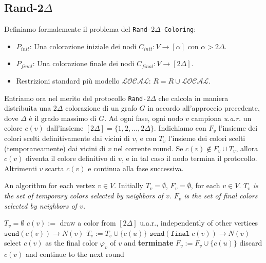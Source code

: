 \subsection{Rand-2$\Delta$}

Definiamo formalemente il problema del \texttt{Rand-$2\Delta$-Coloring}:
\begin{itemize}
    \item $P_{init}$: Una colorazione iniziale dei nodi $C_{init}: V \to [\alpha]$ con $\alpha > 2\Delta$.
    \item $P_{final}$: Una colorazione finale dei nodi $C_{final}: V \to [2\Delta]$.
    \item Restrizioni standard più modello $\mathcal{LOCAL}$: $R = R \cup \mathcal{LOCAL}$.
\end{itemize}

Entriamo ora nel merito del protocollo \texttt{Rand-$2\Delta$} che calcola in maniera distribuita una $2\Delta$ colorazione di un grafo $G$ in accordo all'approccio precedente, dove $\Delta$ è il grado massimo di $G$. Ad ogni fase, ogni nodo $v$ campiona \textit{u.a.r.} un colore $c(v)$ dall'insieme $[2\Delta]=\{1,2,\ldots,2\Delta\}$. Indichiamo con $F_v$ l'insieme dei colori scelti definitivamente dai vicini di $v$, e con $T_v$ l'insieme dei colori scelti (temporaneamente) dai vicini di $v$ nel corrente round. Se $c(v) \notin F_v \cup T_v$, allora $c(v)$ diventa il colore definitivo di $v$, e in tal caso il nodo termina il protocollo. Altrimenti $v$ scarta $c(v)$ e continua alla fase successiva.

\begin{algorithm}
\caption{Procedure \textsc{Rand-2Delta}($G$)}
\begin{algorithmic}[1]

\State An algorithm for each vertex $v \in V$.
\State Initially $T_v = \emptyset$, $F_v = \emptyset$, for each $v \in V$.
\State \textit{$T_v$ is the set of temporary colors selected by neighbors of $v$.}
\State \textit{$F_v$ is the set of final colors selected by neighbors of $v$.}

    \State $T_v = \emptyset$
    \State $c(v) :=$ draw a color from $[2\Delta]$ u.a.r., independently of other vertices
    \State $\texttt{send}(c(v)) \to N(v)$
        \State $T_v := T_v \cup \{c(u)\}$
    \EndFor
        \State $\texttt{send}(\texttt{final} \; c(v)) \to N(v)$
        \State select $c(v)$ as the final color $\varphi_v$ of $v$ and \textbf{terminate}
    \Else
            \State $F_v := F_v \cup \{c(u)\}$
        \EndFor
        \State discard $c(v)$ and continue to the next round
    \EndIf
\EndFor

\end{algorithmic}
\end{algorithm}


